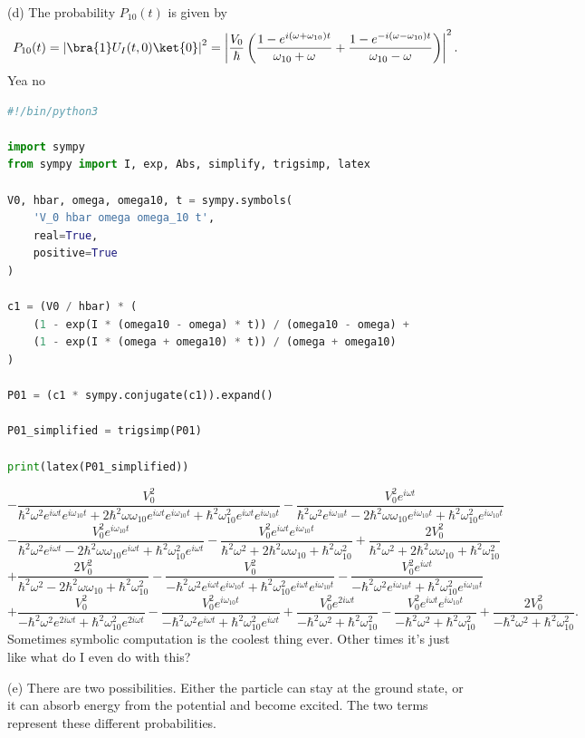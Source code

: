 \documentclass[11pt, letterpaper]{article}
\begin{document}
(d) The probability $P_{10} (t)$ is given by
\[
	P_{10} (t)=\left| \bra{1}U_I(t,0)\ket{0} \right| ^2=\left| \frac{V_0}{\hbar} \left( \frac{1-e^{i(\omega +\omega _{10} )t} }{\omega _{10} +\omega } +\frac{1-e^{-i(\omega -\omega _{10} )t} }{\omega _{10} -\omega }  \right)  \right| ^2
.\]
Yea no
\begin{lstlisting}[language=Python]
#!/bin/python3

import sympy
from sympy import I, exp, Abs, simplify, trigsimp, latex

V0, hbar, omega, omega10, t = sympy.symbols(
    'V_0 hbar omega omega_10 t', 
    real=True, 
    positive=True
)

c1 = (V0 / hbar) * (
    (1 - exp(I * (omega10 - omega) * t)) / (omega10 - omega) + 
    (1 - exp(I * (omega + omega10) * t)) / (omega + omega10)
)

P01 = (c1 * sympy.conjugate(c1)).expand()

P01_simplified = trigsimp(P01)

print(latex(P01_simplified))
\end{lstlisting}
\[
	- \frac{V_{0}^{2}}{\hbar^{2} \omega^{2} e^{i \omega t} e^{i \omega_{10} t} + 2 \hbar^{2} \omega \omega_{10} e^{i \omega t} e^{i \omega_{10} t} + \hbar^{2} \omega_{10}^{2} e^{i \omega t} e^{i \omega_{10} t}} - \frac{V_{0}^{2} e^{i \omega t}}{\hbar^{2} \omega^{2} e^{i \omega_{10} t} - 2 \hbar^{2} \omega \omega_{10} e^{i \omega_{10} t} + \hbar^{2} \omega_{10}^{2} e^{i \omega_{10} t}}
\]
\[
	- \frac{V_{0}^{2} e^{i \omega_{10} t}}{\hbar^{2} \omega^{2} e^{i \omega t} - 2 \hbar^{2} \omega \omega_{10} e^{i \omega t} + \hbar^{2} \omega_{10}^{2} e^{i \omega t}} - \frac{V_{0}^{2} e^{i \omega t} e^{i \omega_{10} t}}{\hbar^{2} \omega^{2} + 2 \hbar^{2} \omega \omega_{10} + \hbar^{2} \omega_{10}^{2}} + \frac{2 V_{0}^{2}}{\hbar^{2} \omega^{2} + 2 \hbar^{2} \omega \omega_{10} + \hbar^{2} \omega_{10}^{2}}
\]
\[
	+ \frac{2 V_{0}^{2}}{\hbar^{2} \omega^{2} - 2 \hbar^{2} \omega \omega_{10} + \hbar^{2} \omega_{10}^{2}} - \frac{V_{0}^{2}}{- \hbar^{2} \omega^{2} e^{i \omega t} e^{i \omega_{10} t} + \hbar^{2} \omega_{10}^{2} e^{i \omega t} e^{i \omega_{10} t}} - \frac{V_{0}^{2} e^{i \omega t}}{- \hbar^{2} \omega^{2} e^{i \omega_{10} t} + \hbar^{2} \omega_{10}^{2} e^{i \omega_{10} t}}
\]
\[
	+ \frac{V_{0}^{2}}{- \hbar^{2} \omega^{2} e^{2 i \omega t} + \hbar^{2} \omega_{10}^{2} e^{2 i \omega t}} - \frac{V_{0}^{2} e^{i \omega_{10} t}}{- \hbar^{2} \omega^{2} e^{i \omega t} + \hbar^{2} \omega_{10}^{2} e^{i \omega t}} + \frac{V_{0}^{2} e^{2 i \omega t}}{- \hbar^{2} \omega^{2} + \hbar^{2} \omega_{10}^{2}} - \frac{V_{0}^{2} e^{i \omega t} e^{i \omega_{10} t}}{- \hbar^{2} \omega^{2} + \hbar^{2} \omega_{10}^{2}} + \frac{2 V_{0}^{2}}{- \hbar^{2} \omega^{2} + \hbar^{2} \omega_{10}^{2}}
.\]
Sometimes symbolic computation is the coolest thing ever. Other times it's just like what do I even do with this? 


(e) There are two possibilities. Either the particle can stay at the ground state, or it can absorb energy from the potential and become excited. The two terms represent these different probabilities.
\end{document}
